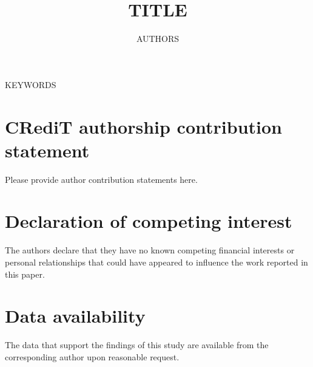 \documentclass[preprint,12pt]{elsarticle}
\begin{document}
\begin{frontmatter}

\title{{{TITLE}}}

\author[inst1]{ {{AUTHORS}} }

\address[inst1]{School/Department, University/Institute, City, Country}

\begin{abstract}

\end{abstract}

\begin{keyword}
{{KEYWORDS}}
\end{keyword}

\end{frontmatter}








\section*{CRediT authorship contribution statement}
Please provide author contribution statements here.

\section*{Declaration of competing interest}
The authors declare that they have no known competing financial interests or personal relationships that could have appeared to influence the work reported in this paper.

\section*{Data availability}
The data that support the findings of this study are available from the corresponding author upon reasonable request.



\end{document}
